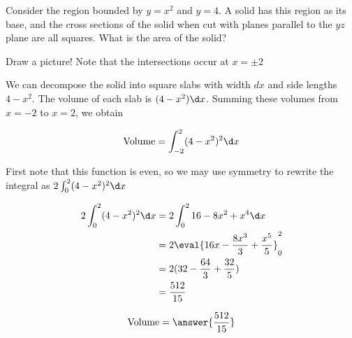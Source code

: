 \documentclass{ximera}
\author{Steven Gubkin}
\begin{document}
\begin{exercise}



Consider the region bounded by $y =x^2$ and $y=4$.  A solid has this region as its base, and the cross sections of the solid when cut with planes parallel to the $yz$ plane are all squares.  What is the area of the solid?


\begin{hint}
	Draw a picture!  Note that the intersections occur at $x= \pm 2$
\end{hint}

\begin{hint}
	We can decompose the solid into square slabs with width $dx$ and side lengths $4-x^2$.  The volume of each slab is $(4-x^2)\d x$.  Summing these volumes from $x=-2$ to $x=2$, we obtain

	\[
	\textrm{Volume} = \int_{-2}^{2} (4-x^2)^2\d x
	\]
\end{hint}

\begin{hint}

	First note that this function is even, so we may use symmetry to rewrite the integral as $2\int_{0}^{2} (4-x^2)^2\d x$

	\begin{align*}
		 2\int_{0}^{2} (4-x^2)^2\d x &=2 \int_{0}^{2} 16-8x^2+x^4 \d x \\
			&=2 \eval{16x-\frac{8x^3}{3}+\frac{x^5}{5}}_0^2 \\
			&=2(32-\frac{64}{3}+\frac{32}{5})\\
			&=\frac{512}{15}
	\end{align*}
\end{hint}

\begin{prompt}
	\[
		\textrm{Volume} = \answer{\frac{512}{15}}
	\]
\end{prompt}

\end{exercise}
\end{document}
